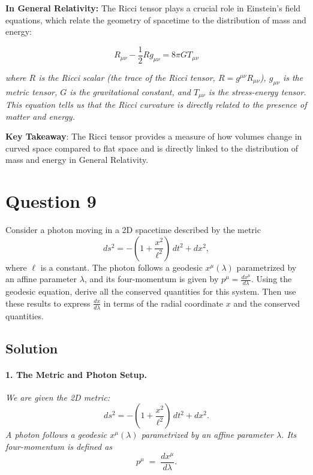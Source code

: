 \textbf{In General Relativity:} The Ricci tensor plays a crucial role in Einstein's field equations, which relate the geometry of spacetime to the distribution of mass and energy:

\[
R_{\mu\nu} - \frac{1}{2} R g_{\mu\nu} = 8\pi G T_{\mu\nu}
\]

\textit{where \(R\) is the Ricci scalar (the trace of the Ricci tensor, \(R = g^{\mu\nu}R_{\mu\nu}\)), \(g_{\mu\nu}\) is the metric tensor, \(G\) is the gravitational constant, and \(T_{\mu\nu}\) is the stress-energy tensor. This equation tells us that the Ricci curvature is directly related to the presence of matter and energy.}

\textbf{Key Takeaway}: The Ricci tensor provides a measure of how volumes change in curved space compared to flat space and is directly linked to the distribution of mass and energy in General Relativity.

\pagebreak

\section*{Question 9}

Consider a photon moving in a 2D spacetime described by the metric
\begin{equation}
ds^2 = -\left(1 + \frac{x^2}{\ell^2}\right)\,dt^2 + dx^2,
\end{equation}
where \(\ell\) is a constant. The photon follows a geodesic \(x^\mu(\lambda)\) parametrized by an affine parameter \(\lambda\), and its four-momentum is given by \(p^\mu = \frac{dx^\mu}{d\lambda}\). Using the geodesic equation, derive all the conserved quantities for this system. Then use these results to express \(\frac{dx}{d\lambda}\) in terms of the radial coordinate \(x\) and the conserved quantities.

\subsection*{Solution}

\paragraph{1. The Metric and Photon Setup.}

\textit{We are given the 2D metric:}
\begin{equation}
ds^2
= -\left(1 + \frac{x^2}{\ell^2}\right)\,dt^2
+ dx^2.
\end{equation}
\textit{A photon follows a geodesic \(x^\mu(\lambda)\) parametrized by an affine parameter \(\lambda\). Its four-momentum is defined as}
\[
p^\mu \;=\; \frac{dx^\mu}{d\lambda}.
\]

